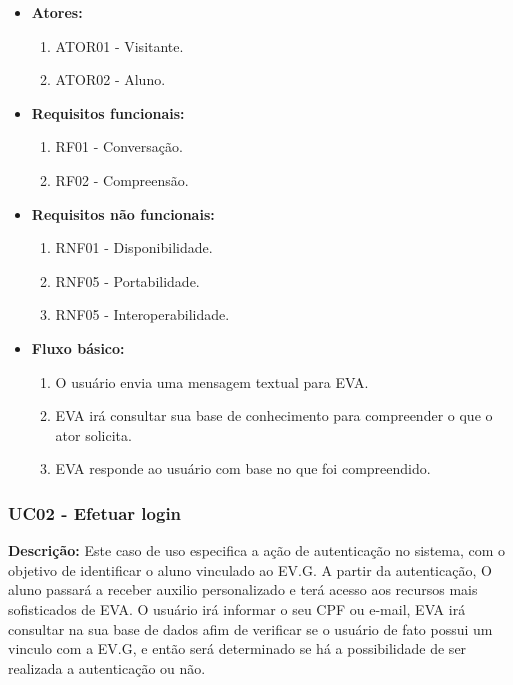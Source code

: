 \begin{itemize}
    \item \textbf{Atores:}
        \begin{enumerate}
            \item ATOR01 - Visitante.
            \item ATOR02 - Aluno.
        \end{enumerate}
    \item \textbf{Requisitos funcionais:}
        \begin{enumerate}
            \item RF01 - Conversação.
            \item RF02 - Compreensão.
        \end{enumerate}
    \item \textbf{Requisitos não funcionais:}
        \begin{enumerate}
            \item RNF01 - Disponibilidade.
            \item RNF05 - Portabilidade.
            \item RNF05 - Interoperabilidade.
        \end{enumerate}
    \item \textbf{Fluxo básico:} 
        \begin{enumerate}
            \item O usuário envia uma mensagem textual para EVA.
            \item EVA irá consultar sua base de conhecimento para compreender o que o ator solicita.
            \item EVA responde ao usuário com base no que foi compreendido.
        \end{enumerate}
\end{itemize}

\subsubsection{UC02 - Efetuar login}
\textbf{Descrição:} Este caso de uso especifica a ação de autenticação no sistema, com o objetivo de identificar o aluno vinculado ao EV.G. A partir da autenticação, O aluno passará a receber auxilio personalizado e terá acesso aos recursos mais sofisticados de EVA. O usuário irá informar o seu CPF ou e-mail, EVA irá consultar na sua base de dados afim de verificar se o usuário de fato possui um vinculo com a EV.G, e então será determinado se há a possibilidade de ser realizada a autenticação ou não.

